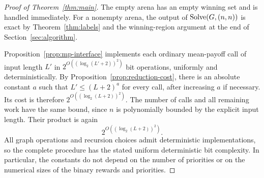 \begin{proof}[Proof of Theorem~\ref{thm:main}]
The empty arena has an empty winning set and is handled immediately.
For a nonempty arena, the output of $\operatorname{Solve}(G,(n,n))$ is exact by
Theorem~\ref{thm:labels} and the winning-region argument at the end of
Section~\ref{sec:algorithm}.

Proposition~\ref{prop:mp-interface} implements each ordinary mean-payoff
call of input length $L'$ in
$2^{O((\log_2(L'+2))^2)}$ bit operations, uniformly and deterministically.
By Proposition~\ref{prop:reduction-cost}, there is an absolute constant
$a$ such that $L'\le(L+2)^a$ for every call, after increasing $a$ if
necessary.  Its cost is therefore
$2^{O((\log_2(L+2))^2)}$.  The number of calls and all remaining work
have the same bound, since $n$ is polynomially bounded by the explicit
input length.  Their product is again
\[
 2^{O((\log_2(L+2))^2)}.
\]
All graph operations and recursion choices admit deterministic
implementations, so the complete procedure has the stated uniform
deterministic bit complexity.  In particular, the constants do not
depend on the number of priorities or on the numerical sizes of the
binary rewards and priorities.
\end{proof}
